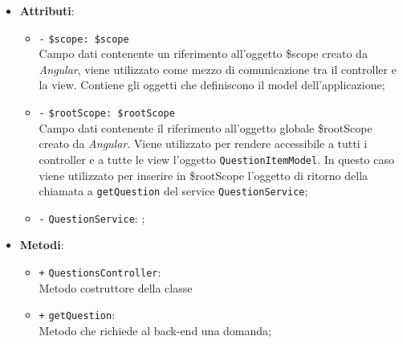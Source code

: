 \begin{itemize}
\begin{itemize}
\begin{itemize}
	\end{itemize}
	\item \textbf{Attributi}:
	\begin{itemize}
		\item \texttt{-} \texttt{\$scope: \$scope} \\
		Campo dati contenente un riferimento all’oggetto \$scope creato da \textit{Angular}, viene utilizzato come mezzo di comunicazione tra il controller e la view. Contiene gli oggetti che definiscono il model dell’applicazione;
		\item \texttt{-} \texttt{\$rootScope: \$rootScope} \\
		Campo dati contenente il riferimento all'oggetto globale \$rootScope creato da \textit{Angular}. Viene utilizzato per rendere accessibile a tutti i controller e a tutte le view l'oggetto \texttt{QuestionItemModel}. In questo caso viene utilizzato per inserire in \$rootScope l'oggetto di ritorno della chiamata a \texttt{getQuestion} del service \texttt{QuestionService};
		\item \texttt{-} \texttt{QuestionService}: ;
	\end{itemize}
	\item \textbf{Metodi}:
	\begin{itemize}
		\item \texttt{+} \texttt{QuestionsController}: \\ Metodo costruttore della classe
		\item \texttt{+} \texttt{getQuestion}: \\ Metodo che richiede al back-end una domanda;
	\end{itemize}
\end{itemize}


\end{itemize}
